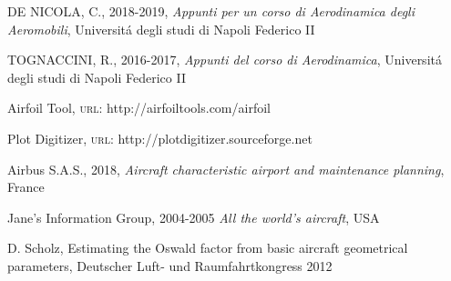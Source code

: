 \begin{thebibliography}{9}


DE NICOLA, C., 2018-2019, 
\emph{ Appunti per un corso di Aerodinamica degli Aeromobili}, Universitá degli studi di Napoli Federico II

TOGNACCINI, R., 2016-2017, 
\emph{Appunti del corso di Aerodinamica}, Universitá degli studi di Napoli Federico II

Airfoil Tool, {\scshape url: }{\color{red} http://airfoiltools.com/airfoil}

Plot Digitizer, {\scshape url: }{\color{red} http://plotdigitizer.sourceforge.net}


Airbus S.A.S., 2018,
\emph{Aircraft characteristic airport and maintenance planning}, France

Jane's Information Group, 2004-2005
\emph{All the world's aircraft}, USA




D. Scholz, Estimating the Oswald factor from basic aircraft geometrical parameters, Deutscher Luft- und Raumfahrtkongress 2012

\end{thebibliography}